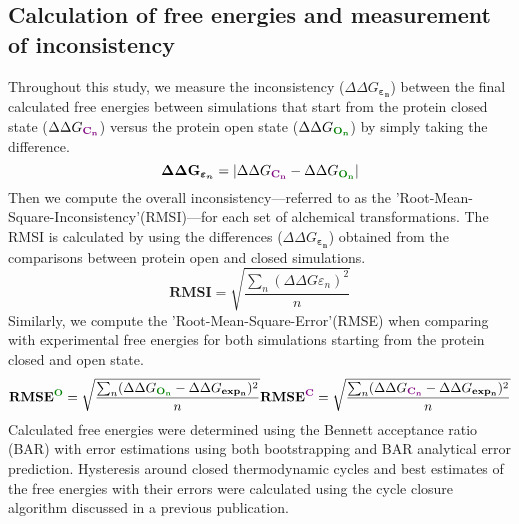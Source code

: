 \documentclass[journal=jctcce,manuscript=article]{achemso}
\begin{document}
\subsection*{Calculation of free energies and measurement of inconsistency}
Throughout this study, we measure the inconsistency ($\Delta\Delta G_{\boldsymbol{\varepsilon_n}}$) between the final calculated free energies between simulations that start from the protein closed state ($\Delta\Delta G_{\color[HTML]{800080}\mathbf{C_n}}$) versus the protein open state ($\Delta\Delta G_{\color[HTML]{008000}\mathbf{O_n}}$) by simply taking the difference.
\begin{equation}
  \mathbf{\Delta\Delta G_{\boldsymbol{\varepsilon_n}}}  = \left |  \Delta\Delta G_{ \color[HTML]{800080}\mathbf{C_n}  } - \Delta\Delta G_{ \color[HTML]{008000}\mathbf{O_n} }\right | 
  \label{eqn:diffG}
\end{equation}
Then we compute the overall inconsistency---referred to as the 'Root-Mean-Square-Inconsistency'(RMSI)---for each set of alchemical transformations.
The RMSI is calculated by using the differences ($\Delta\Delta G_{\boldsymbol{\varepsilon_n}}$) obtained from the comparisons between protein open and closed simulations.
\begin{equation}
\mathbf{RMSI} = \sqrt{   \frac{ \sum_{n} (\Delta\Delta G\varepsilon_{n} )^2  } {n}}
  \label{eqn:RMSI}
\end{equation}
Similarly, we compute the 'Root-Mean-Square-Error'(RMSE) when comparing with experimental free energies for both simulations starting from the protein closed and open state.
\begin{equation}
\mathbf{RMSE^{{\color[HTML]{008000} O}}} = \sqrt{   \frac{ \sum_{n} (\Delta\Delta G_{\mathbf{{\color[HTML]{008000} O_n}}} - \Delta\Delta G_{\mathbf{exp_n}} )^2  } {n}}
\mathbf{RMSE^{{\color[HTML]{800080} C}}} = \sqrt{   \frac{ \sum_{n} (\Delta\Delta G_{\mathbf{{\color[HTML]{800080} C_n}}} - \Delta\Delta G_{\mathbf{exp_n}} )^2  } {n}}
  \label{eqn:RMSE}
\end{equation}
Calculated free energies were determined using the Bennett acceptance ratio\cite{BAR} (BAR) with error estimations using both bootstrapping and BAR analytical error prediction\cite{BARerror}.
Hysteresis around closed thermodynamic cycles and best estimates of the free energies with their errors were calculated using the cycle closure algorithm discussed in a previous publication\cite{FEP/REST}.
\end{document}

